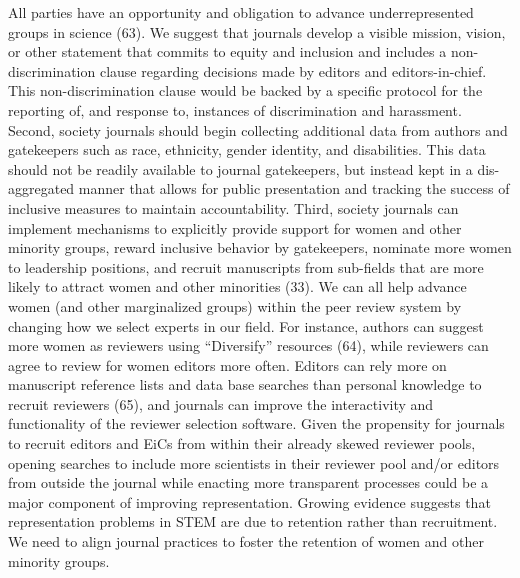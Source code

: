 \documentclass[11pt,]{article}
\begin{document}
All parties have an opportunity and obligation to advance
underrepresented groups in science (63). We suggest that journals
develop a visible mission, vision, or other statement that commits to
equity and inclusion and includes a non-discrimination clause regarding
decisions made by editors and editors-in-chief. This non-discrimination
clause would be backed by a specific protocol for the reporting of, and
response to, instances of discrimination and harassment. Second, society
journals should begin collecting additional data from authors and
gatekeepers such as race, ethnicity, gender identity, and disabilities.
This data should not be readily available to journal gatekeepers, but
instead kept in a dis-aggregated manner that allows for public
presentation and tracking the success of inclusive measures to maintain
accountability. Third, society journals can implement mechanisms to
explicitly provide support for women and other minority groups, reward
inclusive behavior by gatekeepers, nominate more women to leadership
positions, and recruit manuscripts from sub-fields that are more likely
to attract women and other minorities (33). We can all help advance
women (and other marginalized groups) within the peer review system by
changing how we select experts in our field. For instance, authors can
suggest more women as reviewers using ``Diversify'' resources (64),
while reviewers can agree to review for women editors more often.
Editors can rely more on manuscript reference lists and data base
searches than personal knowledge to recruit reviewers (65), and journals
can improve the interactivity and functionality of the reviewer
selection software. Given the propensity for journals to recruit editors
and EiCs from within their already skewed reviewer pools, opening
searches to include more scientists in their reviewer pool and/or
editors from outside the journal while enacting more transparent
processes could be a major component of improving representation.
Growing evidence suggests that representation problems in STEM are due
to retention rather than recruitment. We need to align journal practices
to foster the retention of women and other minority groups.
\end{document}
